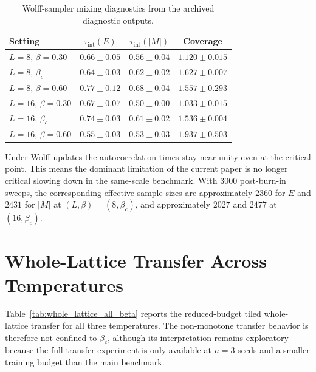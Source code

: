 \documentclass[12pt,a4paper]{memoir}
\begin{document}
\begin{table}[ht]
    \centering
    \caption{Wolff-sampler mixing diagnostics from the archived diagnostic
        outputs.}
    \begin{tabular}{lccc}
        \toprule
        \textbf{Setting} & \textbf{$\tau_{\mathrm{int}}(E)$} & \textbf{$\tau_{\mathrm{int}}(|M|)$} & \textbf{Coverage} \\
        \midrule
        $L=8$, $\beta=0.30$   & $0.66 \pm 0.05$  & $0.56 \pm 0.04$  & $1.120 \pm 0.015$ \\
        $L=8$, $\beta_c$      & $0.64 \pm 0.03$  & $0.62 \pm 0.02$  & $1.627 \pm 0.007$ \\
        $L=8$, $\beta=0.60$   & $0.77 \pm 0.12$  & $0.68 \pm 0.04$  & $1.557 \pm 0.293$ \\
        $L=16$, $\beta=0.30$  & $0.67 \pm 0.07$  & $0.50 \pm 0.00$  & $1.033 \pm 0.015$ \\
        $L=16$, $\beta_c$     & $0.74 \pm 0.03$  & $0.61 \pm 0.02$  & $1.536 \pm 0.004$ \\
        $L=16$, $\beta=0.60$  & $0.55 \pm 0.03$  & $0.53 \pm 0.03$  & $1.937 \pm 0.503$ \\
        \bottomrule
    \end{tabular}
    \label{tab:mixing}
\end{table}

Under Wolff updates the autocorrelation times stay near unity even at the
critical point.  This means the dominant limitation of the current paper is no
longer critical slowing down in the same-scale benchmark.  With 3000
post-burn-in sweeps, the corresponding effective sample sizes are approximately
$2360$ for $E$ and $2431$ for $|M|$ at $(L,\beta)=(8,\beta_c)$, and
approximately $2027$ and $2477$ at $(16,\beta_c)$.

\section{Whole-Lattice Transfer Across Temperatures}
\label{app:whole_lattice}

Table~\ref{tab:whole_lattice_all_beta} reports the reduced-budget tiled
whole-lattice transfer for all three temperatures.  The non-monotone transfer
behavior is therefore not confined to $\beta_c$, although its interpretation
remains exploratory because the full transfer experiment is only available at
$n=3$ seeds and a smaller training budget than the main benchmark.
\end{document}
